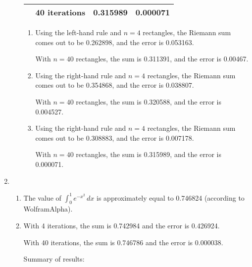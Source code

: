 \documentclass[11pt]{article}
\begin{document}
\begin{enumerate}
\begin{enumerate}[label={\roman*)}]
\begin{center}
\begin{tabular}{l l c c}
                            & 40 iterations & 0.315989 & 0.000071 \\
                            \bottomrule
                        \end{tabular}
                    \end{center}
                    \begin{enumerate}[label={(\alph*)}]
                        \item
                            Using the left-hand rule and $n=4$ rectangles, the Riemann sum comes out to be 0.262898, and the error is 0.053163.
                            \par\noindent
                            With $n=40$ rectangles, the sum is 0.311391, and the error is 0.00467.
                        \item
                            Using the right-hand rule and $n=4$ rectangles, the Riemann sum comes out to be 0.354868, and the error is 0.038807.
                            \par\noindent
                            With $n=40$ rectangles, the sum is 0.320588, and the error is 0.004527.
                        \item
                            Using the right-hand rule and $n=4$ rectangles, the Riemann sum comes out to be 0.308883, and the error is 0.007178.
                            \par\noindent
                            With $n=40$ rectangles, the sum is 0.315989, and the error is 0.000071.
                    \end{enumerate}
            \end{enumerate}
        \item
            \begin{enumerate}[label={\roman*)}]
                \item
                    The value of $\int_0^1 e^{-x^2}\,dx$ is approximately equal to 0.746824 (according to WolframAlpha).
                \item
                    With 4 iterations, the sum is 0.742984 and the error is 0.426924.
                    \par\noindent
                    With 40 iterations, the sum is 0.746786 and the error is 0.000038.
                    \par\noindent
                    Summary of results:
                    \begin{center}
                        \begin{tabular}{l c c}

\end{tabular}
\end{center}
\end{enumerate}
\end{enumerate}
\end{document}

